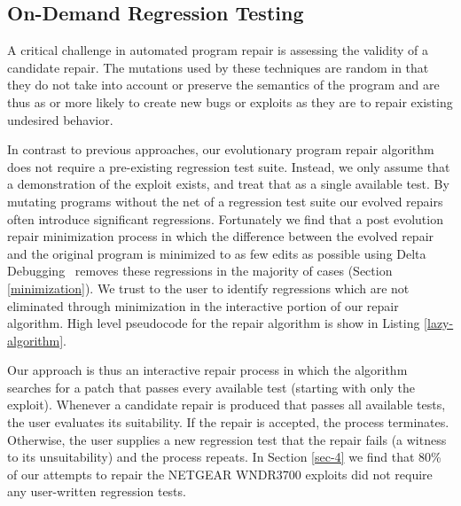 \documentclass{sigcomm-alternate}
\begin{document}
\subsection{On-Demand Regression Testing}
\label{on-demand-regression}

A critical challenge in automated program repair is assessing the
validity of a candidate repair.  The mutations used by these
techniques are random in that they do not take into account or
preserve the semantics of the program and are thus as or more likely
to create new bugs or exploits as they are to repair existing
undesired behavior.

In contrast to previous approaches, our evolutionary program repair
algorithm does not require a pre-existing regression test suite.
Instead, we only assume that a demonstration of the exploit exists,
and treat that as a single available test.  By mutating programs
without the net of a regression test suite our evolved repairs often
introduce significant regressions.  Fortunately we find that a post
evolution repair minimization process in which the difference between
the evolved repair and the original program is minimized to as few
edits as possible using Delta Debugging~\cite{delta} removes these
regressions in the majority of cases (Section \ref{minimization}).  We
trust to the user to identify regressions which are not eliminated
through minimization in the interactive portion of our repair
algorithm.  High level pseudocode for the repair algorithm is show in
Listing \ref{lazy-algorithm}.

Our approach is thus an interactive repair process in which the
algorithm searches for a patch that 
passes every available test (starting with only the exploit). 
Whenever a candidate repair is produced that passes all available tests,
the user evaluates its suitability. If the repair is accepted, the process
terminates. Otherwise, the user supplies a new regression test that the repair
fails (a witness to its unsuitability) and the process repeats. 
In Section \ref{sec-4} we find that 80\% of our
attempts to repair the NETGEAR WNDR3700 exploits did not require any
user-written regression tests.
\end{document}

